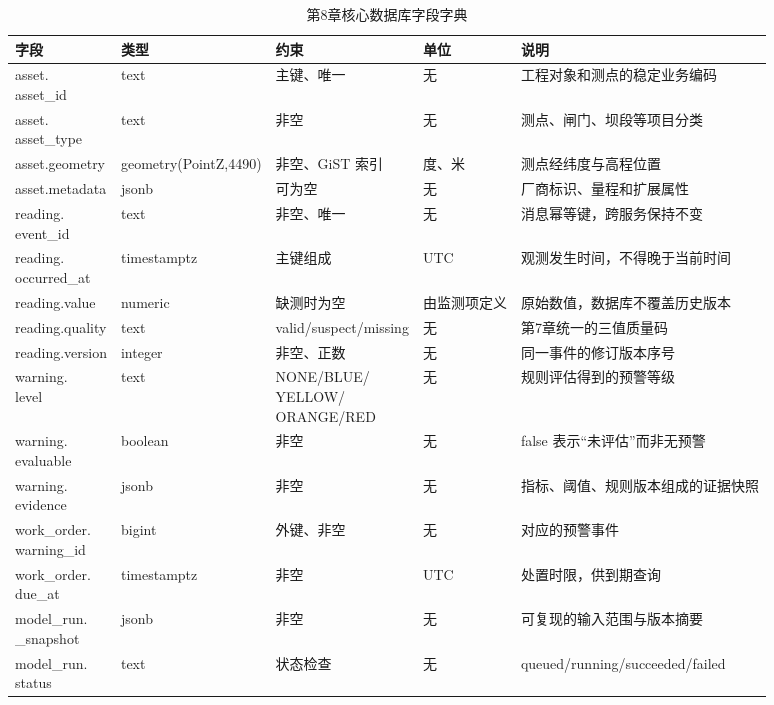 \begin{table}[htbp]
\centering
\scriptsize
\setlength{\tabcolsep}{2pt}
\caption{第8章核心数据库字段字典}
\label{tab:ch08-database-dictionary}
\begin{tabular}{p{2.0cm}p{3.1cm}p{2.8cm}p{1.5cm}p{4.8cm}}
\toprule
字段 & 类型 & 约束 & 单位 & 说明 \\
\midrule
\shortstack{asset.\\asset\_id} & text & 主键、唯一 & 无 & 工程对象和测点的稳定业务编码 \\
\shortstack{asset.\\asset\_type} & text & 非空 & 无 & 测点、闸门、坝段等项目分类 \\
asset.geometry & geometry(PointZ,4490) & 非空、GiST 索引 & 度、米 & 测点经纬度与高程位置 \\
asset.metadata & jsonb & 可为空 & 无 & 厂商标识、量程和扩展属性 \\
\shortstack{reading.\\event\_id} & text & 非空、唯一 & 无 & 消息幂等键，跨服务保持不变 \\
\shortstack{reading.\\occurred\_at} & timestamptz & 主键组成 & UTC & 观测发生时间，不得晚于当前时间 \\
reading.value & numeric & 缺测时为空 & 由监测项定义 & 原始数值，数据库不覆盖历史版本 \\
reading.quality & text & valid/suspect/missing & 无 & 第7章统一的三值质量码 \\
reading.version & integer & 非空、正数 & 无 & 同一事件的修订版本序号 \\
\shortstack{warning.\\level} & text & \shortstack{NONE/BLUE/\\YELLOW/\\ORANGE/RED} & 无 & 规则评估得到的预警等级 \\
\shortstack{warning.\\evaluable} & boolean & 非空 & 无 & false 表示“未评估”而非无预警 \\
\shortstack{warning.\\evidence} & jsonb & 非空 & 无 & 指标、阈值、规则版本组成的证据快照 \\
\shortstack{work\_order.\\warning\_id} & bigint & 外键、非空 & 无 & 对应的预警事件 \\
\shortstack{work\_order.\\due\_at} & timestamptz & 非空 & UTC & 处置时限，供到期查询 \\
\shortstack{model\_run.\\_snapshot} & jsonb & 非空 & 无 & 可复现的输入范围与版本摘要 \\
\shortstack{model\_run.\\status} & text & 状态检查 & 无 & queued/running/succeeded/failed \\
\bottomrule
\end{tabular}
\end{table}

